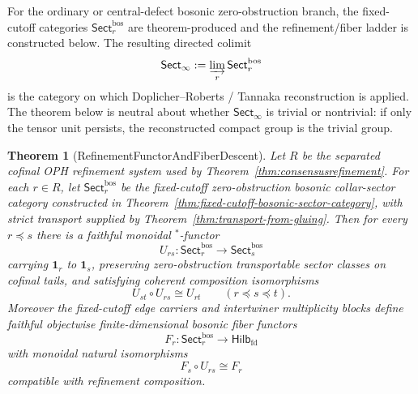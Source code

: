 \documentclass[11pt]{article}
\newtheorem{theorem}{Theorem}[section]
\begin{document}
For the ordinary or central-defect bosonic zero-obstruction branch, the fixed-cutoff categories
\(\mathsf{Sect}^{\mathrm{bos}}_r\) are theorem-produced and the refinement/fiber ladder is
constructed below. The resulting directed colimit
\[
\mathsf{Sect}_\infty := \varinjlim_r \mathsf{Sect}^{\mathrm{bos}}_r
\]
is the category on which Doplicher--Roberts / Tannaka reconstruction is applied. The theorem below
is neutral about whether \(\mathsf{Sect}_\infty\) is trivial or nontrivial: if only the tensor unit
persists, the reconstructed compact group is the trivial group.

\begin{theorem}[RefinementFunctorAndFiberDescent]\label{thm:refinement-functor-fiber-descent}
Let \(R\) be the separated cofinal OPH refinement system used by
Theorem~\ref{thm:consensusrefinement}. For each \(r\in R\), let
\(\mathsf{Sect}^{\mathrm{bos}}_r\) be the fixed-cutoff zero-obstruction bosonic collar-sector
category constructed in Theorem~\ref{thm:fixed-cutoff-bosonic-sector-category}, with strict
transport supplied by Theorem~\ref{thm:transport-from-gluing}. Then for every \(r\preceq s\)
there is a faithful monoidal \(^*\)-functor
\[
U_{rs}:\mathsf{Sect}^{\mathrm{bos}}_r\longrightarrow \mathsf{Sect}^{\mathrm{bos}}_s
\]
carrying \(\mathbf 1_r\) to \(\mathbf 1_s\), preserving zero-obstruction transportable sector
classes on cofinal tails, and satisfying coherent composition isomorphisms
\[
U_{st}\circ U_{rs}\cong U_{rt}
\qquad (r\preceq s\preceq t).
\]
Moreover the fixed-cutoff edge carriers and intertwiner multiplicity blocks define faithful
objectwise finite-dimensional bosonic fiber functors
\[
F_r:\mathsf{Sect}^{\mathrm{bos}}_r\longrightarrow \mathsf{Hilb}_{\mathrm{fd}}
\]
with monoidal natural isomorphisms
\[
F_s\circ U_{rs}\cong F_r
\]
compatible with refinement composition.
\end{theorem}
\end{document}
